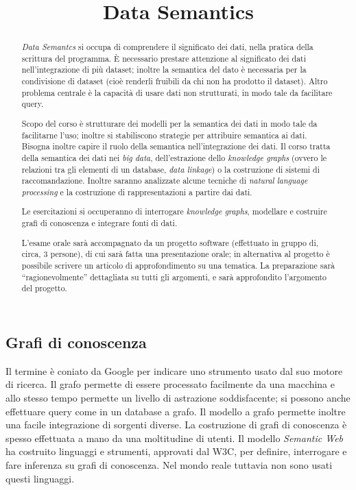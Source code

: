 \documentclass[11pt]{article}
\title{\textbf{Data Semantics}}
\author{}
\date{}
\begin{document}
\maketitle
\begin{multicols}{2}
\begin{abstract}
  \textit{Data Semantcs} si occupa di comprendere il significato dei dati, nella pratica della scrittura del programma.
  È necessario prestare attenzione al significato dei dati nell'integrazione di più dataset; inoltre la semantica del dato è necessaria per la condivisione di dataset (cioè renderli fruibili da chi non ha prodotto il dataset).
  Altro problema centrale è la capacità di usare dati non strutturati, in modo tale da facilitare query.
  
  Scopo del corso è strutturare dei modelli per la semantica dei dati in modo tale da facilitarne l'uso; inoltre si stabiliscono strategie per attribuire semantica ai dati.
  Bisogna inoltre capire il ruolo della semantica nell'integrazione dei dati.
  Il corso tratta della semantica dei dati nei \textit{big data}, dell'estrazione dello \textit{knowledge graphs} (ovvero le relazioni tra gli elementi di un database, \textit{data linkage}) o la costruzione di sistemi di raccomandazione.
  Inoltre saranno analizzate alcune tecniche di \textit{natural language processing} e la costruzione di rappresentazioni a partire dai dati.

  Le esercitazioni si occuperanno di interrogare \textit{knowledge graphs}, modellare e costruire grafi di conoscenza e integrare fonti di dati.

  L'esame orale sarà accompagnato da un progetto software (effettuato in gruppo di, circa, 3 persone), di cui sarà fatta una presentazione orale; in alternativa al progetto è possibile scrivere un articolo di approfondimento su una tematica.
  La preparazione sarà ``ragionevolmente'' dettagliata su tutti gli argomenti, e sarà approfondito l'argomento del progetto.
\end{abstract}
\tableofcontents

\newpage
\part{Grafi di conoscenza}
Il termine è coniato da Google per indicare uno strumento usato dal suo motore di ricerca.
Il grafo permette di essere processato facilmente da una macchina e allo stesso tempo permette un livello di astrazione soddisfacente; si possono anche effettuare query come in un database a grafo.
Il modello a grafo permette inoltre una facile integrazione di sorgenti diverse.
La costruzione di grafi di conoscenza è spesso effettuata a mano da una moltitudine di utenti.
Il modello \textit{Semantic Web} ha costruito linguaggi e strumenti, approvati dal W3C, per definire, interrogare e fare inferenza su grafi di conoscenza.
Nel mondo reale tuttavia non sono usati questi linguaggi.


\end{multicols}
\end{document}
